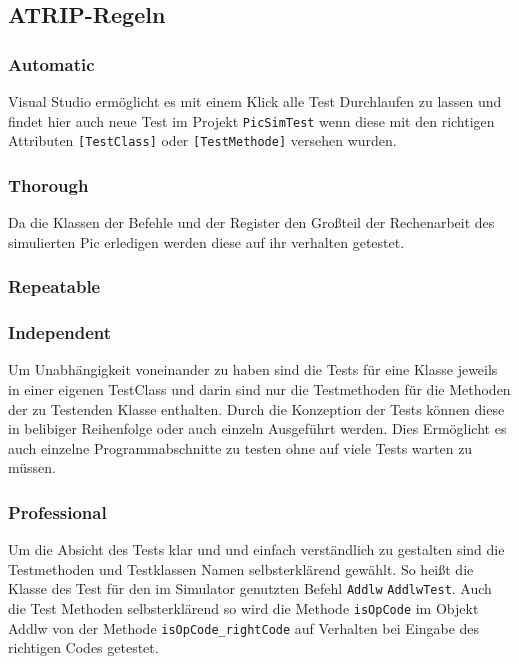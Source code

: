 \documentclass[12pt,a4paper,titlepage,ngerman,pdftex]{report}
\begin{document}
    \subsection{ATRIP-Regeln}
	\label{subsec:atrip-regeln}

    \subsubsection{Automatic}
	Visual Studio ermöglicht es mit einem Klick alle Test Durchlaufen zu lassen und findet hier auch neue Test im Projekt \verb|PicSimTest| wenn diese mit den richtigen Attributen \verb|[TestClass]| oder \verb|[TestMethode]| versehen wurden.
	
    \subsubsection{Thorough}\label{subsec:thorough}
    Da die Klassen der Befehle und der Register den Großteil der Rechenarbeit des simulierten Pic erledigen werden diese auf ihr verhalten getestet.
    

    \subsubsection{Repeatable}

    \subsubsection{Independent}
	Um Unabhängigkeit voneinander zu haben sind die Tests für eine Klasse jeweils in einer eigenen TestClass und darin sind nur die Testmethoden für die Methoden der zu Testenden Klasse enthalten.
 	Durch die Konzeption der Tests können diese in belibiger Reihenfolge oder auch einzeln Ausgeführt werden. 
 	Dies Ermöglicht es auch einzelne Programmabschnitte zu testen ohne auf viele Tests warten zu müssen.
    \subsubsection{Professional}
    Um die Absicht des Tests klar und und einfach verständlich zu gestalten sind die Testmethoden und Testklassen Namen selbsterklärend gewählt. 
    So heißt die Klasse des Test für den im Simulator genutzten Befehl \verb|Addlw|  \verb|AddlwTest|.
    Auch die Test Methoden selbsterklärend so wird die Methode \verb|isOpCode| im Objekt Addlw von der Methode \verb|isOpCode_rightCode| auf Verhalten bei Eingabe des richtigen Codes getestet.
\end{document}
